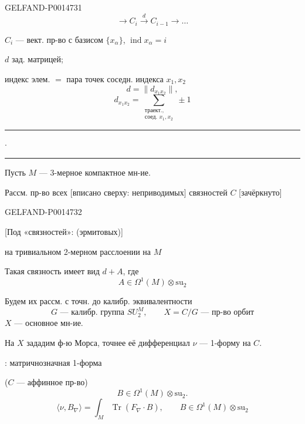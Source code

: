 \begin{GelfandAdjacentEvidence}{GELFAND-P001473}{1}
\begin{equation*}
\longrightarrow C_i\xrightarrow{d}C_{i-1}\longrightarrow\ldots
\tag{3}
\end{equation*}

\(C_i\) — вект. пр-во с базисом \(\{x_\alpha\}\), \(\operatorname{ind}x_\alpha=i\)

\(d\) зад. матрицей;

индекс элем. \(=\) пара точек соседн. индекса \(x_1,x_2\)
\[
d=\lVert d_{x_1x_2}\rVert,
\]
\begin{equation*}
d_{x_1x_2}=\sum_{\substack{\text{траект.,}\\\text{соед. }x_1,x_2}}\pm1
\tag{4}
\end{equation*}

\begin{center}
\rule{12mm}{.4pt}\quad\(\cdot\)\quad\rule{12mm}{.4pt}
\end{center}

Пусть \(M\) — 3-мерное компактное мн-ие.

Рассм. пр-во всех [вписано сверху: неприводимых] связностей \(C\) [зачёркнуто]

\end{GelfandAdjacentEvidence}
\begin{GelfandAdjacentEvidence}{GELFAND-P001473}{2}


[Под «связностей»: (эрмитовых)]

на тривиальном 2-мерном расслоении на \(M\)

Такая связность имеет вид \(d+A\), где
\[
A\in\Omega^1(M)\otimes\mathrm{su}_2
\]
\end{GelfandAdjacentEvidence}


Будем их рассм. с точн. до калибр. эквивалентности
\[
G\text{ — калибр. группа }SU_2^M,\qquad X=C/G\text{ — пр-во орбит}
\]
\(X\) — основное мн-ие.

На \(X\) зададим ф-ю Морса, точнее её дифференциал
\(\nu\) — 1-форму на \(C\).

: матричнозначная 1-форма

(\(C\) — аффинное пр-во)
\[
B\in\Omega^1(M)\otimes\mathrm{su}_2.
\]
\begin{equation*}
\langle\nu,B_\nabla\rangle
 =\int_M\operatorname{Tr}(F_\nabla\cdot B),\qquad
 B\in\Omega^1(M)\otimes\mathrm{su}_2
\tag{5}
\end{equation*}

